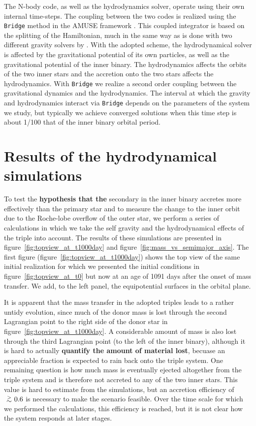 \documentclass[twocolumn]{aastex62}
\def\apgt{\ {\raise-.5ex\hbox{$\buildrel>\over\sim$}}\ }
\begin{document}
The N-body code, as well as the hydrodynamics solver, operate using
their own internal time-steps. The coupling between the two codes is
realized using the \texttt{Bridge} method in the AMUSE framework
\citep[see Sect.\.4.3.1 in][]{2013CoPhC.183..456P}.  This coupled
integrator is based on the splitting of the Hamiltonian, much in the
same way as is done with two different gravity solvers by
\cite{2007PASJ...59.1095F}. With the adopted scheme, the
hydrodynamical solver is affected by the gravitational potential of
its own particles, as well as the gravitational potential of the inner
binary. The hydrodynamics affects the orbits of the two inner stars
and the accretion onto the two stars affects the hydrodynamics. With
\texttt{Bridge} we realize a second order coupling between the
gravitational dynamics and the hydrodynamics.  The interval at which
the gravity and hydrodynamics interact via \texttt{Bridge} depends on
the parameters of the system we study, but typically we achieve
converged solutions when this time step is about 1/100 that of the
inner binary orbital period.

\section{Results of the hydrodynamical simulations} \label{results}

To test the \textbf{hypothesis that the} secondary in the inner binary
accretes more effectively than the primary star and to measure the
change to the inner orbit due to the Roche-lobe overflow of the outer
star, we perform a series of calculations in which we take the self
gravity and the hydrodynamical effects of the triple into account.
The results of these simulations are presented in
figure~\ref{fig:topview_at_t1000day} and
figure~\ref{fig:mass_vs_semimajor_axis}.  The first figure
(figure~\ref{fig:topview_at_t1000day}) shows the top view of the same
initial realization for which we presented the initial conditions in
figure~\ref{fig:topview_at_t0} but now at an age of 1091 days after
the onset of mass transfer. We add, to the left panel,
the equipotential surfaces in the orbital plane.

It is apparent that the mass transfer in the adopted triples leads to
a rather untidy evolution, since much of the donor mass is lost
through the second Lagrangian point to the right side of the donor
star in figure~\ref{fig:topview_at_t1000day}. A considerable amount of
mass is also lost through the third Lagrangian point (to the left of
the inner binary), although it is hard to actually \textbf{quantify the amount
of material lost}, becuase an appreciable fraction is expected to rain
back onto the triple system.  One remaining question is how much mass
is eventually ejected altogether from the triple system and is
therefore not accreted to any of the two inner stars. This value is
hard to estimate from the simulations, but an accretion efficiency of
$\apgt 0.6$ is necessary to make the scenario feasible. Over the time
scale for which we performed the calculations, this efficiency is
reached, but it is not clear how the system responds at later stages.
\end{document}
